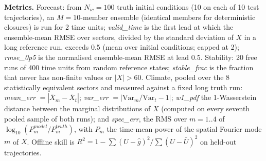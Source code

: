 \textbf{Metrics.} Forecast: from $N_{ic}{=}100$ truth initial conditions (10 on each of 10 test trajectories), an $M{=}10$-member ensemble (identical members for deterministic closures) is run for 2 time units; \emph{valid\_time} is the first lead at which the ensemble-mean RMSE over sectors, divided by the standard deviation of $X$ in a long reference run, exceeds 0.5 (mean over initial conditions; capped at 2); \emph{rmse\_0p5} is the normalised ensemble-mean RMSE at lead 0.5. Stability: 20 free runs of 400 time units from random reference states; \emph{stable\_frac} is the fraction that never has non-finite values or $|X|>60$. Climate, pooled over the 8 statistically equivalent sectors and measured against a fixed long truth run: \emph{mean\_err} $=|\bar X_m-\bar X_t|$; \emph{var\_err} $=|\mathrm{Var}_m/\mathrm{Var}_t-1|$; \emph{w1\_pdf} the 1-Wasserstein distance between the marginal distributions of $X$ (computed on every seventh pooled sample of both runs); and \emph{spec\_err}, the RMS over $m{=}1..4$ of $\log_{10}(P_m^{model}/P^{truth}_m)$, with $P_m$ the time-mean power of the spatial Fourier mode $m$ of $X$. Offline skill is $R^2=1-\sum(U-\hat g)^2/\sum(U-\bar U)^2$ on held-out trajectories.
